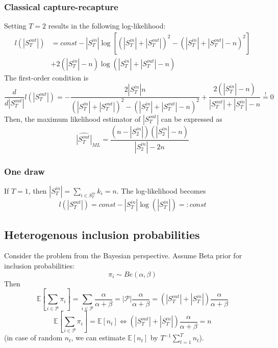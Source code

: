\documentclass[a4paper, 12pt]{article}
\newcommand{\sout}[1][T]{|S^{out}_{#1}|}
\newcommand{\sint}[1][T]{|S^{in}_{#1}|}
\begin{document}
\subsubsection{Classical capture-recapture}
Setting $T = 2$ results in the following log-likelihood:
\begin{align*}
l(\sout) &= const - \sint \log[(\sint + \sout)^{2} - (\sint + \sout - n)^2] \\ 
&+ 2(\sint  - n) \log (\sint + \sout - n)
\end{align*}
The first-order condition is
\begin{equation*}
\frac{d}{d\sout}l(\sout) = -\frac{2\sint n}{(\sint + \sout)^{2} - (\sint + \sout - n)^2} + \frac{2(\sint  - n)}{\sout + \sint - n} \overset{!}{=} 0
\end{equation*}
Then, the maximum likelihood estimator of $\sout$ can be expressed as
\begin{equation}
\widehat{\sout}_{ML} = \frac{(n - \sint[2])(\sint[2] - n)}{\sint[2] - 2n}
\end{equation}
\subsubsection{One draw}
If $T = 1$, then $\sint = \sum_{i \in S_T^{in}} k_i = n$. The log-likelihood becomes
\begin{equation*}
l(\sout) = const - \sint \log(\sint) =: const
\end{equation*}
\subsection{Heterogenous inclusion probabilities}
Consider the problem from the Bayesian perspective. Assume Beta prior for inclusion probabilities:
\begin{equation*}
    \pi_i \sim Be(\alpha, \beta)
\end{equation*}
Then
\begin{equation*}
    \mathbb{E}[\sum_{i \in \mathcal{P}} \pi_i] = \sum_{i \in \mathcal{P}} \frac{\alpha}{\alpha + \beta} = |\mathcal{P}| \frac{\alpha}{\alpha + \beta} = (|S_T^{out}| + |S_T^{in}|) \frac{\alpha}{\alpha + \beta}
\end{equation*}
\begin{equation} \label{eq:2}
    \mathbb{E}[\sum_{i \in \mathcal{P}} \pi_i] = \mathbb{E}[n_t]
    \Leftrightarrow (|S_T^{out}| + |S_T^{in}|) \frac{\alpha}{\alpha + \beta} = n
\end{equation}
(in case of random $n_t$, we can estimate $\mathbb{E}[n_t]$ by $T^{-1} \sum_{t=1}^T n_t$).
\end{document}
